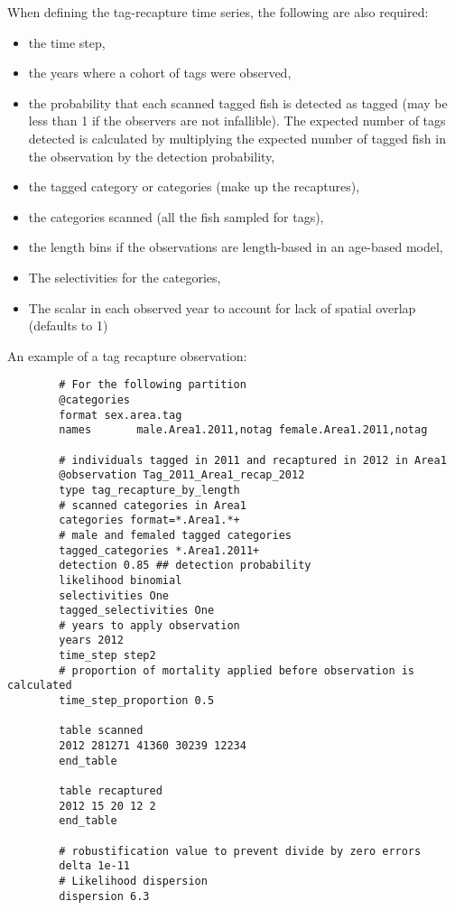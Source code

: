 When defining the tag-recapture time series, the following are also required:

\begin{itemize}
	\item the time step,
	\item the years where a cohort of tags were observed,
	\item the probability that each scanned tagged fish is detected as tagged (may be less than 1 if the observers are not infallible). The expected number of tags detected is calculated by multiplying the expected number of tagged fish in the observation by the detection probability,
	\item the tagged category or categories (make up the recaptures),
	\item the categories scanned (all the fish sampled for tags),
	\item the length bins if the observations are length-based in an age-based model,
	\item The selectivities for the categories,
	\item The scalar in each observed year to account for lack of spatial overlap (defaults to 1)
\end{itemize}

An example of a tag recapture observation:

{\small{\begin{verbatim}
		# For the following partition
		@categories
		format sex.area.tag
		names  		male.Area1.2011,notag female.Area1.2011,notag
		
		# individuals tagged in 2011 and recaptured in 2012 in Area1
		@observation Tag_2011_Area1_recap_2012
		type tag_recapture_by_length
		# scanned categories in Area1
		categories format=*.Area1.*+
		# male and femaled tagged categories
		tagged_categories *.Area1.2011+
		detection 0.85 ## detection probability
		likelihood binomial
		selectivities One
		tagged_selectivities One
		# years to apply observation
		years 2012
		time_step step2
		# proportion of mortality applied before observation is calculated
		time_step_proportion 0.5
		
		table scanned
		2012 281271 41360 30239 12234
		end_table
		
		table recaptured
		2012 15 20 12 2
		end_table
		
		# robustification value to prevent divide by zero errors
		delta 1e-11
		# Likelihood dispersion
		dispersion 6.3
		\end{verbatim}}}


